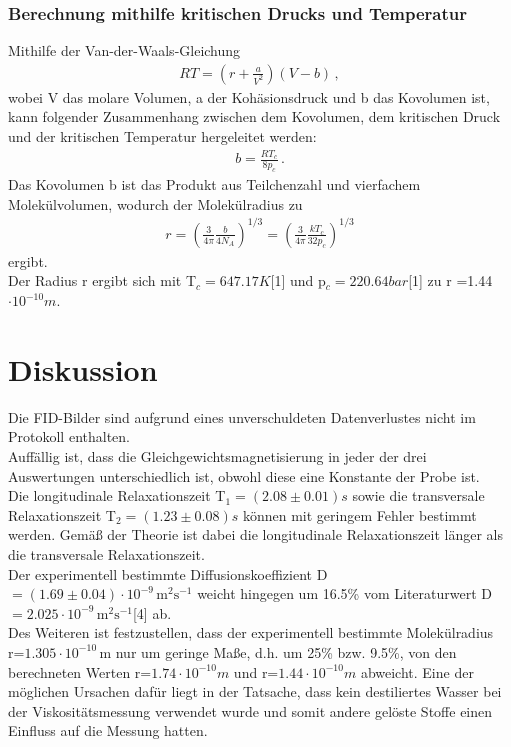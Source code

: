 \documentclass[]{scrartcl}
\begin{document}
\subsubsection{Berechnung mithilfe kritischen Drucks und Temperatur}
Mithilfe der Van-der-Waals-Gleichung 
\begin{align*}
RT = \left( r+\frac{a}{V^2}\right) (V-b)\, ,
\end{align*}
wobei V das molare Volumen, a der Kohäsionsdruck und b das Kovolumen ist, kann folgender Zusammenhang zwischen dem Kovolumen, dem kritischen Druck und der kritischen Temperatur hergeleitet werden:
\begin{align*}
b = \frac{RT_c}{8p_c}\,.
\end{align*}
Das Kovolumen b ist das Produkt aus Teilchenzahl und vierfachem Molekülvolumen, wodurch der Molekülradius zu
\begin{align*}
r= \left( \frac{3}{4\pi}\frac{b}{4N_A}\right) ^{1/3}=\left( \frac{3}{4\pi}\frac{kT_c}{32p_c}\right) ^{1/3}
\end{align*}
ergibt. \\
Der Radius r ergibt sich mit T$_c=647.17\si{K}$[1] und p$_c=220.64\si{bar}$[1] zu r =1.44$\cdot10^{-10}\si{m}$.

\section{Diskussion}
Die FID-Bilder sind aufgrund eines unverschuldeten Datenverlustes nicht im Protokoll
enthalten.\\
Auffällig ist, dass die Gleichgewichtsmagnetisierung in jeder der drei Auswertungen unterschiedlich ist, obwohl diese eine Konstante der Probe ist. \\
Die longitudinale Relaxationszeit T$_1=(2.08 \pm 0.01)\si{s}$ sowie die transversale Relaxationszeit T$_2=(1.23 \pm 0.08)\si{s}$ können mit geringem Fehler bestimmt werden. Gemäß der Theorie ist dabei die longitudinale Relaxationszeit länger als die transversale Relaxationszeit. \\
Der experimentell bestimmte Diffusionskoeffizient D\,$=(1.69\pm 0.04) \cdot10^{-9}\,\text{m}^2\text{s}^{-1}$ weicht hingegen um 16.5\% vom Literaturwert D\,$=2.025\cdot10^{-9}\,\text{m}^2\text{s}^{-1}$[4] ab. \\
Des Weiteren ist festzustellen, dass der experimentell bestimmte Molekülradius r=$ 1.305\cdot10^{-10}\,\text{m}$ nur um geringe Maße, d.h. um 25\% bzw. 9.5\%, von den berechneten Werten r=$1.74\cdot10^{-10}\si{m}$ und r=$1.44\cdot10^{-10}\si{m}$ abweicht. Eine der möglichen Ursachen dafür liegt in der Tatsache, dass kein destiliertes Wasser bei der Viskositätsmessung verwendet wurde und somit andere gelöste Stoffe einen Einfluss auf die Messung hatten.
\end{document}
